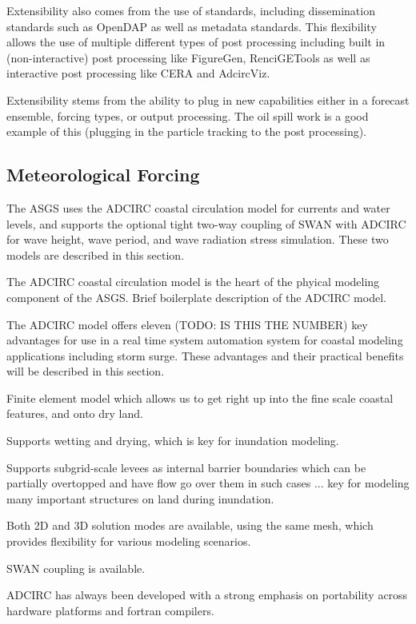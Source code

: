 \documentclass[jmse,article,submit,moreauthors,pdftex,12pt,a4paper]{mdpi}
\begin{document}
Extensibility also comes from the use of standards, including 
dissemination standards such as OpenDAP as well as metadata 
standards. This flexibility allows the use of multiple different 
types of post processing including built in (non-interactive) post 
processing like FigureGen, RenciGETools as well as interactive post 
processing like CERA and AdcircViz.

Extensibility stems from the ability to plug in new capabilities
either in a forecast ensemble, forcing types, or output processing.
The oil spill work is a good example of this (plugging in the 
particle tracking to the post processing). 

\subsection{Meteorological Forcing}

The ASGS uses the ADCIRC coastal circulation model for currents and 
water levels, and supports the optional tight two-way coupling of 
SWAN with ADCIRC for wave height, wave period, and wave radiation 
stress simulation. These two models are described in this section. 

The ADCIRC coastal circulation model is the heart of the phyical 
modeling component of the ASGS. Brief boilerplate description of the 
ADCIRC model. 

The ADCIRC model offers eleven (TODO: IS THIS THE NUMBER) key 
advantages for use in a real time system automation system for 
coastal modeling applications including storm surge. These 
advantages and their practical benefits will be described in this 
section. 

Finite element model which allows us to get right up into the fine 
scale coastal features, and onto dry land. 

Supports wetting and drying, which is key for inundation modeling.

Supports subgrid-scale levees as internal barrier boundaries which 
can be partially overtopped and have flow go over them in such cases 
... key for modeling many important structures on land during 
inundation. 

Both 2D and 3D solution modes are available, using the same mesh, 
which provides flexibility for various modeling scenarios. 

SWAN coupling is available. 


ADCIRC has always been developed with a strong emphasis on 
portability across hardware platforms and fortran compilers.
\end{document}
